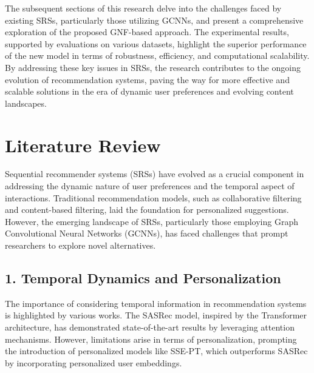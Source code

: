 \documentclass[journal]{IEEEtran}
\begin{document}
The subsequent sections of this research delve into the challenges faced by existing SRSs, particularly those 
utilizing GCNNs, and present a comprehensive exploration of the proposed GNF-based approach. The experimental 
results, supported by evaluations on various datasets, highlight the superior performance of the new model in 
terms of robustness, efficiency, and computational scalability. By addressing these key issues in SRSs, the 
research contributes to the ongoing evolution of recommendation systems, paving the way for more effective and 
scalable solutions in the era of dynamic user preferences and evolving content landscapes.


\section{Literature Review}
Sequential recommender systems (SRSs) have evolved as a crucial component in addressing the dynamic nature \cite{10.1145/3383313.3412258} of user 
preferences and the temporal aspect of interactions. Traditional recommendation models, such as collaborative filtering 
and content-based filtering, laid the foundation for personalized suggestions. However, the emerging landscape of SRSs, 
particularly those employing Graph Convolutional Neural Networks (GCNNs), has faced challenges that prompt researchers 
to explore novel alternatives.

\subsection*{1. Temporal Dynamics and Personalization}
The importance of considering temporal information in recommendation systems is highlighted by various works. The SASRec model, 
inspired by the Transformer architecture, has demonstrated state-of-the-art results by leveraging attention mechanisms. 
However, limitations arise in terms of personalization, prompting the introduction of personalized models like SSE-PT, 
which outperforms SASRec by incorporating personalized user embeddings.


\end{document}
